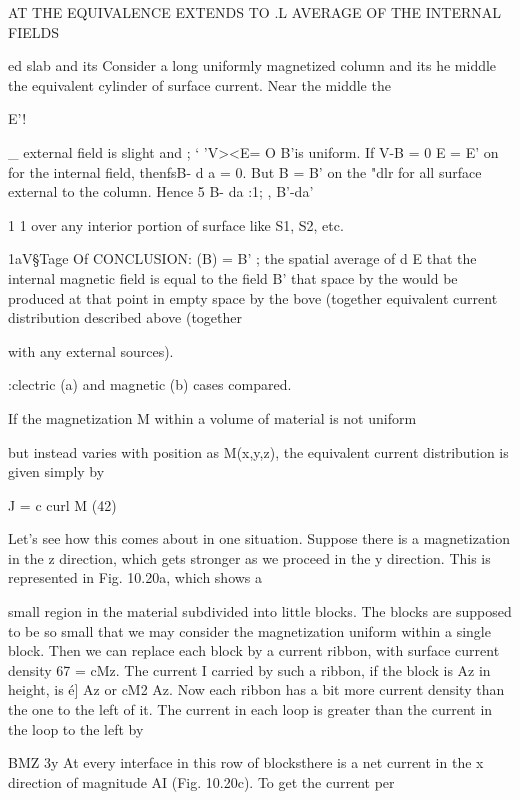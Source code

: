 {AT THE EQUIVALENCE EXTENDS TO
.L AVERAGE OF THE INTERNAL FIELDS

ed slab and its Consider a long uniformly magnetized column and its
he middle the equivalent cylinder of surface
current. Near the middle the

   
  

   

E'!

_ external field is slight and ;  ‘
'V><E= O B'is uniform. If V-B = 0 
E = E' on for the internal field, thenfsB- d a = 0. But B = B' on the
"dlr for all surface external to the column. Hence 5 B- da :1; , B'-da'

1 1
over any interior portion of surface like S1, S2, etc.

1aV§Tage Of CONCLUSION: (B) = B' ; the spatial average of
d E that the internal magnetic field is equal to the field B' that
space by the would be produced at that point in empty space by the
bove (together equivalent current distribution described above (together

with any external sources).

:clectric (a) and magnetic (b) cases compared.

If the magnetization M within a volume of material is not uniform

but instead varies with position as M(x,y,z), the equivalent current
distribution is given simply by
\begin{equation}
\end{equation}

J = c curl M (42)

Let's see how this comes about in one situation. Suppose there is a
magnetization in the z direction, which gets stronger as we proceed
in the y direction. This is represented in Fig. 10.20a, which shows a

small region in the material subdivided into little blocks. The blocks
are supposed to be so small that we may consider the magnetization
uniform within a single block. Then we can replace each block by
a current ribbon, with surface current density 67 = cMz. The current
I carried by such a ribbon, if the block is Az in height, is é] Az
or cM2 Az. Now each ribbon has a bit more current density than
the one to the left of it. The current in each loop is greater than the
current in the loop to the left by

BMZ
3y
At every interface in this row of blocksthere is a net current in the
x direction of magnitude AI (Fig. 10.20c). To get the current per

}
